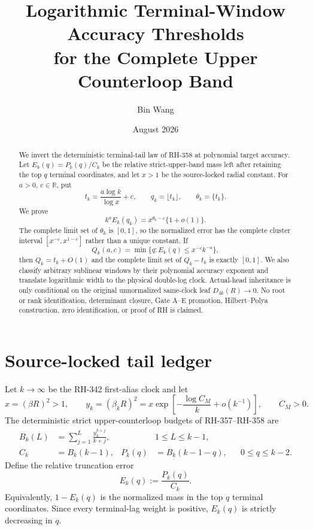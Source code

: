 \documentclass[11pt]{article}
\title{Logarithmic Terminal-Window Accuracy Thresholds\\
for the Complete Upper Counterloop Band}
\author{Bin Wang}
\date{August 2026}
\theoremstyle{remark}
\begin{document}
\maketitle

\begin{abstract}
We invert the deterministic terminal-tail law of RH-358 at polynomial target
accuracy.  Let $E_k(q)=P_k(q)/C_k$ be the relative strict-upper-band mass left
after retaining the top $q$ terminal coordinates, and let $x>1$ be the
source-locked radial constant.  For $a>0$, $c\in\mathbb R$, put
\[
 t_k=\frac{a\log k}{\log x}+c,\qquad q_k=\lfloor t_k\rfloor,
 \qquad\theta_k=\{t_k\}.
\]
We prove
\[
 k^aE_k(q_k)=x^{\theta_k-c}\{1+o(1)\}.
\]
The complete limit set of $\theta_k$ is $[0,1]$, so the normalized error has
the complete cluster interval $[x^{-c},x^{1-c}]$ rather than a unique
constant.  If
\[
 Q_k(a,c)=\min\{q:E_k(q)\le x^{-c}k^{-a}\},
\]
then $Q_k=t_k+O(1)$ and the complete limit set of $Q_k-t_k$ is exactly
$[0,1]$.  We also classify arbitrary sublinear windows by their polynomial
accuracy exponent and translate logarithmic width to the physical double-log
clock.  Actual-head inheritance is only conditional on the original
unnormalized same-clock leaf $D_{4k}(R)\to0$.  No root or rank identification,
determinant closure, Gate A--E promotion, Hilbert--Polya construction, zero
identification, or proof of RH is claimed.
\end{abstract}

\section{Source-locked tail ledger}

Let $k\to\infty$ be the RH-342 first-alias clock and let
\begin{equation}\label{eq:x-y}
 x=(\beta R)^2>1,
 \qquad
 y_k=(\beta_kR)^2
 =x\exp\left[-\frac{\log C_M}{k}+o(k^{-1})\right],
 \qquad C_M>0.
\end{equation}
The deterministic strict upper-counterloop budgets of RH-357--RH-358 are
\begin{align}
 B_k(L)&=\sum_{j=1}^{L}\frac{y_k^{k+j}}{k+j},
 &&1\le L\le k-1,\label{eq:B}\\
 C_k&=B_k(k-1),
 &P_k(q)&=B_k(k-1-q),
 &&0\le q\le k-2.\label{eq:C-P}
\end{align}
Define the relative truncation error
\begin{equation}\label{eq:E}
 E_k(q):=\frac{P_k(q)}{C_k}.
\end{equation}
Equivalently, $1-E_k(q)$ is the normalized mass in the top $q$ terminal
coordinates.  Since every terminal-lag weight is positive, $E_k(q)$ is
strictly decreasing in $q$.
\end{document}
